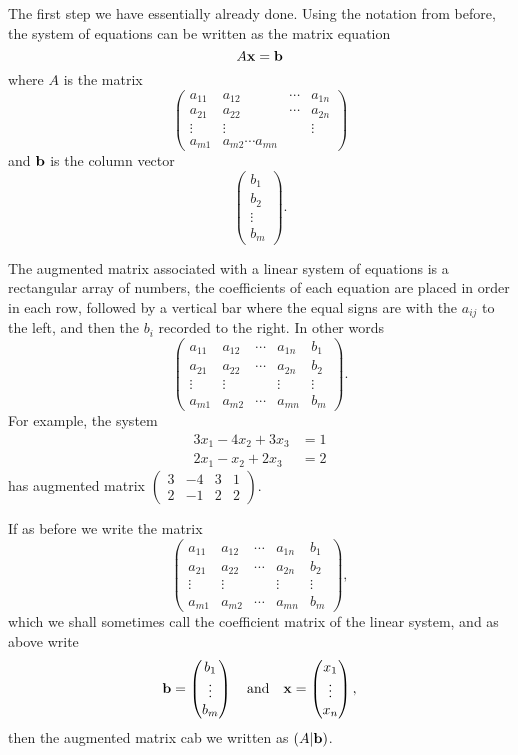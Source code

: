 \documentclass[10pt, a4paper]{article}
\begin{document}
The first step we have essentially already done.
Using the notation from before,
the system of equations can be written as the matrix equation
\[
A\mathbf{x} = \mathbf{b}
\]
where $A$ is the matrix
\[
\begin{pmatrix}
    a_{1 1} & a_{1 2} & \dotsi & a_{1 n} \\
    a_{2 1} & a_{2 2} & \dotsi & a_{2 n} \\
    \vdots & \vdots & \phantom{} & \vdots \\
    a_{m 1} & a_{m 2} \dotsi a_{m n}
\end{pmatrix}
\]
and $\mathbf{b}$ is the column vector
\[
\begin{pmatrix}
    b_1 \\ b_2 \\ \vdots \\ b_m
\end{pmatrix}.
\]

The augmented matrix associated with a linear system of equations is a rectangular array of numbers,
the coefficients of each equation are placed in order in each row,
followed by a vertical bar where the equal signs are with the $a_{i j}$ to the left,
and then the $b_i$ recorded to the right.
In other words
\[
\left(
\begin{array}{cccc|c}
    a_{1 1} & a_{1 2} & \dotsi & a_{1 n} & b_1 \\
    a_{2 1} & a_{2 2} & \dotsi & a_{2 n} & b_2 \\
    \vdots & \vdots & \phantom{} & \vdots & \vdots \\
    a_{m 1} & a_{m 2} & \dotsi & a_{m n} & b_m
\end{array}
\right).
\]
For example, the system
\begin{align*}
    3x_1 - 4x_2 + 3x_3 &= 1 \\
    2x_1 - x_2 + 2x_3 &= 2
\end{align*}
has augmented matrix $\left(
\begin{array}{ccc|c}
    3 & -4 & 3 & 1 \\
    2 & -1 & 2 & 2
\end{array}
\right).$

If as before we write the matrix
\[
\left(
\begin{array}{cccc|c}
    a_{1 1} & a_{1 2} & \dotsi & a_{1 n} & b_1 \\
    a_{2 1} & a_{2 2} & \dotsi & a_{2 n} & b_2 \\
    \vdots & \vdots & \phantom{} & \vdots & \vdots \\
    a_{m 1} & a_{m 2} & \dotsi & a_{m n} & b_m
\end{array}
\right),
\]
which we shall sometimes call the coefficient matrix of the linear system,
and as above write
\[
\mathbf{b} = \begin{pmatrix}
    b_1 \\ \vdots \\ b_m
\end{pmatrix}
\quad\text{and}\quad\mathbf{x} = \begin{pmatrix}
    x_1 \\ \vdots \\ x_n
\end{pmatrix},
\]
then the augmented matrix cab we written as $(A | \mathbf{b})$.
\end{document}
